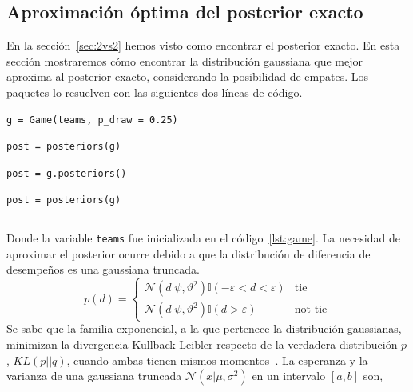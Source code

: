 \documentclass[a4paper,11pt]{book}
\newcommand{\N}{\mathcal{N}}
\theoremstyle{definition}
\begin{document}
\subsection{Aproximación óptima del posterior exacto} \label{sec:approximate_posterior}
%
En la sección~\ref{sec:2vs2} hemos visto como encontrar el posterior exacto.
%
En esta sección mostraremos cómo encontrar la distribución gaussiana que mejor aproxima al posterior exacto, considerando la posibilidad de empates.
%
Los paquetes lo resuelven con las siguientes dos líneas de código.
%
\begin{lstlisting}[backgroundcolor=\color{all},belowskip=-0.77 \baselineskip]
g = Game(teams, p_draw = 0.25)
\end{lstlisting}
\begin{paracol}{3}
\begin{lstlisting}[backgroundcolor=\color{julia!60}, belowskip=0cm]
post = posteriors(g)
\end{lstlisting}
\switchcolumn
\begin{lstlisting}[backgroundcolor=\color{python!60}, belowskip=0cm]
post = g.posteriors()
\end{lstlisting}
\switchcolumn
\begin{lstlisting}[backgroundcolor=\color{r!50}, belowskip=0cm]
post = posteriors(g)
\end{lstlisting}
\end{paracol}
\begin{lstlisting}[captionpos=b,backgroundcolor=\color{white}, label=lst:post_2vs2, caption={Computando el posterior aproximado}, belowskip=0cm, aboveskip=0cm]
\end{lstlisting}
%
Donde la variable \texttt{teams} fue inicializada en el código~\ref{lst:game}.
%
La necesidad de aproximar el posterior ocurre debido a que la distribución de diferencia de desempeños es una gaussiana truncada.
%
\begin{equation}\label{eq:p_d}
p(d) =
\begin{cases}
\N(d|\psi,\vartheta^2) \mathbb{I}(-\varepsilon < d < \varepsilon) & \text{tie} \\
\N(d|\psi,\vartheta^2) \mathbb{I}(d > \varepsilon) & \text{not tie}
\end{cases}
\end{equation}
%
Se sabe que la familia exponencial, a la que pertenece la distribución gaussianas, minimizan la divergencia Kullback-Leibler respecto de la verdadera distribución $p$, $KL(p||q)$, cuando ambas tienen mismos momentos~\cite{Minka2005}.
%
La esperanza y la varianza de una gaussiana truncada $\N(x|\mu,\sigma^2)$ en un intervalo $[a,b]$ son,
\end{document}
